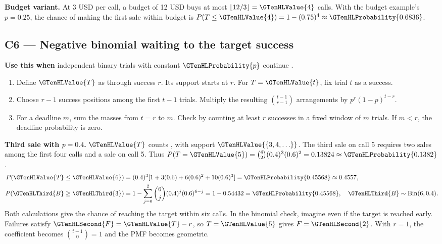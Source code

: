 \textbf{Budget variant.} At 3 USD per call, a budget of 12 USD buys at most \(\lfloor12/3\rfloor=\GTenHLValue{4}\) calls. With the budget example's \(p=0.25\), the chance of making the first sale within budget is \(P(T\leq\GTenHLValue{4})=1-(0.75)^4\approx\GTenHLProbability{0.6836}\).
\par\nobreak\vspace{6pt}

\subsection{C6 --- Negative binomial waiting to the target success}\label{crit:C6}
\textbf{Use this when} independent binary trials with constant \(\GTenHLProbability{p}\) continue .

\begin{enumerate}
\item Define \(\GTenHLValue{T}\) as  through success \(r\). Its support starts at \(r\). For \(T=\GTenHLValue{t}\), fix trial \(t\) as a success.
\item Choose \(r-1\) success positions among the first \(t-1\) trials. Multiply the resulting \(\binom{t-1}{r-1}\) arrangements by \(p^r(1-p)^{t-r}\).
\item For a deadline \(m\), sum the masses from \(t=r\) to \(m\). Check by counting at least \(r\) successes in a fixed window of \(m\) trials. If \(m<r\), the deadline probability is zero.
\end{enumerate}

\textbf{Third sale with \(p=0.4\).} \(\GTenHLValue{T}\) counts , with support \(\GTenHLValue{\{3,4,\ldots\}}\). The third sale on call 5 requires two sales among the first four calls and a sale on call 5. Thus \(P(T=\GTenHLValue{5})=\binom42(0.4)^3(0.6)^2=0.13824\approx\GTenHLProbability{0.1382}\).
\[
\begin{aligned}
P(\GTenHLValue{T}\leq\GTenHLValue{6})
 &= (0.4)^3[1+3(0.6)+6(0.6)^2+10(0.6)^3]
 =\GTenHLProbability{0.45568}\approx0.4557,\\
P(\GTenHLThird{B}\geq\GTenHLThird{3})
 &= 1-\sum_{j=0}^{2}\binom6j(0.4)^j(0.6)^{6-j}
 =1-0.54432=\GTenHLProbability{0.45568},\quad \GTenHLThird{B}\sim\operatorname{Bin}(6,0.4).
\end{aligned}
\]
Both calculations give the chance of reaching the target within six calls. In the binomial check, imagine  even if the target is reached early. Failures satisfy \(\GTenHLSecond{F}=\GTenHLValue{T}-r\), so \(T=\GTenHLValue{5}\) gives \(F=\GTenHLSecond{2}\). With \(r=1\), the coefficient becomes \(\binom{t-1}{0}=1\) and the PMF becomes geometric.
\par\nobreak
{}

